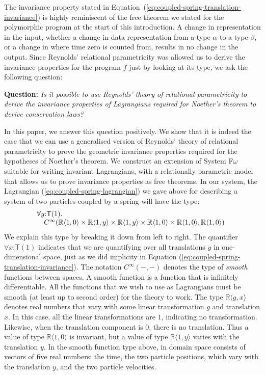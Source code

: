 \documentclass[preprint]{sigplanconf}
\theoremstyle{examplestyle}
\begin{document}
The invariance property stated in
Equation~(\ref{eq:coupled-spring-translation-invariance}) is highly
reminiscent of the free theorem we stated for the polymorphic program
at the start of this introduction. A change in representation in the
input, whether a change in data representation from a type $\alpha$ to
a type $\beta$, or a change in where time zero is counted from,
results in no change in the output. Since Reynolds' relational
parametricity was allowed us to derive the invariance properties for
the program $f$ just by looking at its type, we ask the following
question:

\medskip

\noindent
\textbf{Question:} \emph{Is it possible to use Reynolds' theory of
  relational parametricity to derive the invariance properties of
  Lagrangians required for Noether's theorem to derive conservation
  laws?}

\medskip

In this paper, we answer this question positively. We show that it is
indeed the case that we can use a generalised version of Reynolds'
theory of relational parametricity to prove the geometric invariance
properties required for the hypotheses of Noether's theorem. We
construct an extension of System F$\omega$ suitable for writing
invariant Lagrangians, with a relationally parametric model that
allows us to prove invariance properties as free theorems. In our
system, the Lagrangian (\ref{eq:coupled-spring-lagrangian}) we gave
above for describing a system of two particles coupled by a spring
will have the type:
\begin{displaymath}
  \begin{array}{@{}l}
  \forall y \mathord: \mathsf{T}(1).\\
  \quad C^\infty(\mathbb{R}\langle 1, 0 \rangle \times \mathbb{R}\langle 1, y \rangle \times \mathbb{R}\langle 1, y \rangle \times \mathbb{R}\langle 1, 0 \rangle \times \mathbb{R}\langle 1, 0 \rangle, \mathbb{R}\langle 1, 0 \rangle)
\end{array}
\end{displaymath}
We explain this type by breaking it down from left to right. The
quantifier $\forall x \mathord: \mathsf{T}(1)$ indicates that we are
quantifying over all translations $y$ in one-dimensional space, just
as we did implicity in Equation
(\ref{eq:coupled-spring-translation-invariance}). The notation
$C^\infty(-,-)$ denotes the type of \emph{smooth} functions between
spaces. A smooth function is a function that is infinitely
differentiable. All the functions that we wish to use as Lagrangians
must be smooth (at least up to second order) for the theory to
work. The type $\mathbb{R}\langle g, x \rangle$ denotes real numbers
that vary with some linear transformation $g$ and translation $x$. In
this case, all the linear transformations are $1$, indicating no
transformation. Likewise, when the translation component is $0$, there
is no translation. Thus a value of type $\mathbb{R}\langle 1, 0
\rangle$ is invariant, but a value of type $\mathbb{R}\langle 1, y
\rangle$ varies with the translation $y$. In the smooth function type
above, in domain space consists of vectors of five real numbers: the
time, the two particle positions, which vary with the translation $y$,
and the two particle velocities.
\end{document}
